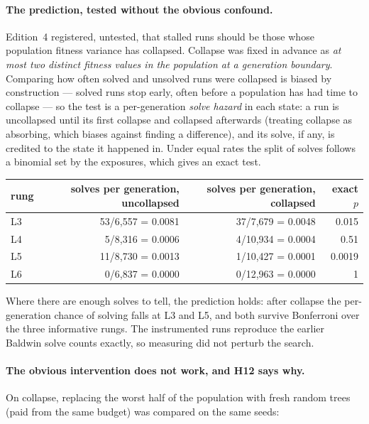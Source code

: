 \documentclass[11pt,a4paper]{article}
\theoremstyle{definition}
\theoremstyle{remark}
\begin{document}
\paragraph{The prediction, tested without the obvious confound.} Edition~4 registered, untested, that stalled runs should be those whose population fitness variance has collapsed. Collapse was fixed in advance as \emph{at most two distinct fitness values in the population at a generation boundary}. Comparing how often solved and unsolved runs were collapsed is biased by construction --- solved runs stop early, often before a population has had time to collapse --- so the test is a per-generation \emph{solve hazard} in each state: a run is uncollapsed until its first collapse and collapsed afterwards (treating collapse as absorbing, which biases against finding a difference), and its solve, if any, is credited to the state it happened in. Under equal rates the split of solves follows a binomial set by the exposures, which gives an exact test.

\begin{center}
\begin{tabular}{lrrr}
\toprule
rung & solves per generation, uncollapsed & solves per generation, collapsed & exact $p$ \\
\midrule
L3 & 53/6,557 = 0.0081 & 37/7,679 = 0.0048 & 0.015 \\
L4 & 5/8,316 = 0.0006 & 4/10,934 = 0.0004 & 0.51 \\
L5 & 11/8,730 = 0.0013 & 1/10,427 = 0.0001 & 0.0019 \\
L6 & 0/6,837 = 0.0000 & 0/12,963 = 0.0000 & 1 \\
\bottomrule
\end{tabular}
\end{center}

Where there are enough solves to tell, the prediction holds: after collapse the per-generation chance of solving falls at L3 and L5, and both survive Bonferroni over the three informative rungs. The instrumented runs reproduce the earlier Baldwin solve counts exactly, so measuring did not perturb the search. 

\paragraph{The obvious intervention does not work, and H12 says why.} On collapse, replacing the worst half of the population with fresh random trees (paid from the same budget) was compared on the same seeds:
\end{document}
